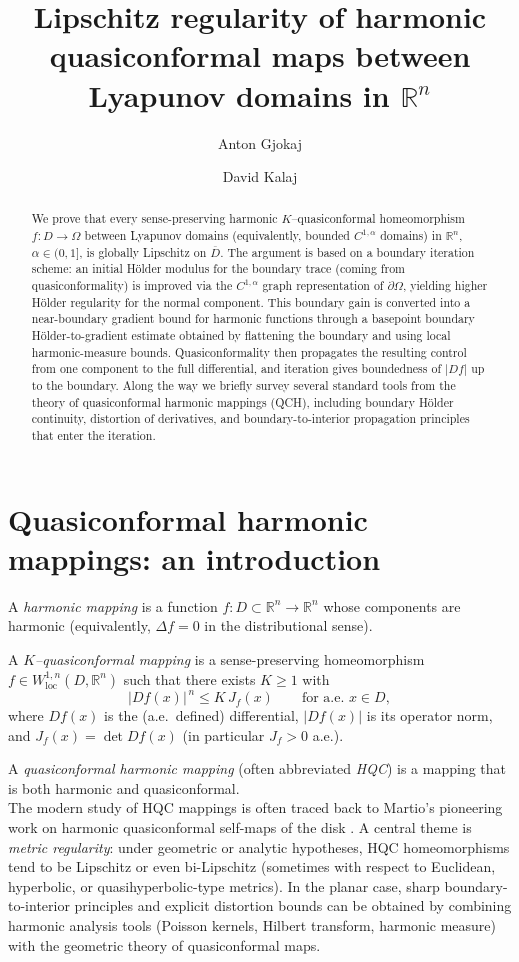 \documentclass{amsart}
\title{Lipschitz regularity of harmonic quasiconformal maps
between Lyapunov domains in $\mathbb{R}^n$}
\author{Anton Gjokaj}
\author{David Kalaj}
\date{}
\newcommand{\R}{\mathbb{R}}
\begin{document}
\maketitle
\begin{abstract}
We prove that every sense-preserving harmonic $K$--quasiconformal homeomorphism
$f\colon D\to\Omega$ between Lyapunov domains (equivalently, bounded $C^{1,\alpha}$ domains)
in $\mathbb{R}^n$, $\alpha\in(0,1]$, is globally Lipschitz on $\overline D$.
The argument is based on a boundary iteration scheme: an initial H\"older modulus for the
boundary trace (coming from quasiconformality) is improved via the $C^{1,\alpha}$ graph
representation of $\partial\Omega$, yielding higher H\"older regularity for the normal component.
This boundary gain is converted into a near-boundary gradient bound for harmonic functions
through a basepoint boundary H\"older-to-gradient estimate obtained by flattening the boundary and using
local harmonic-measure bounds. Quasiconformality then propagates the resulting control from one
component to the full differential, and iteration gives boundedness of $|Df|$ up to the boundary.
Along the way we briefly survey several standard tools from the theory of quasiconformal harmonic
mappings (QCH), including boundary H\"older continuity, distortion of derivatives, and
boundary-to-interior propagation principles that enter the iteration.
\end{abstract}
\section{Quasiconformal harmonic mappings: an introduction}

A \emph{harmonic mapping} is a function $f:D\subset \R^n\to \R^n$ whose components are harmonic
(equivalently, $\Delta f=0$ in the distributional sense).

A \emph{$K$--quasiconformal mapping} is a
sense-preserving homeomorphism $f\in W^{1,n}_{\mathrm{loc}}(D,\R^n)$ such that there exists
$K\ge 1$ with
\[
|Df(x)|^{\,n}\le K\, J_f(x)\qquad \text{for a.e.\ }x\in D,
\]
where $Df(x)$ is the (a.e.\ defined) differential, $|Df(x)|$ is its operator norm, and
$J_f(x)=\det Df(x)$ (in particular $J_f>0$ a.e.).

A \emph{quasiconformal harmonic mapping} (often abbreviated \emph{HQC}) is a mapping that is
both harmonic and quasiconformal.
\\

The modern study of HQC mappings is often traced back to Martio's pioneering work
on harmonic quasiconformal self-maps of the disk \cite{Martio1969}.
A central theme is \emph{metric regularity}: under geometric or analytic hypotheses,
HQC homeomorphisms tend to be Lipschitz or even bi-Lipschitz (sometimes with respect to
Euclidean, hyperbolic, or quasihyperbolic-type metrics). In the planar case, sharp
boundary-to-interior principles and explicit distortion bounds can be obtained by combining
harmonic analysis tools (Poisson kernels, Hilbert transform, harmonic measure) with the
geometric theory of quasiconformal maps.
\end{document}
